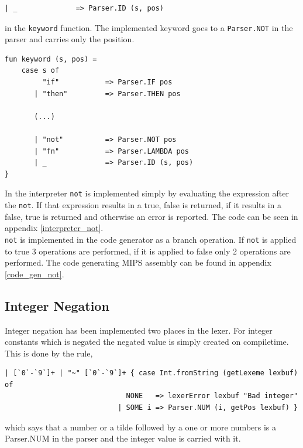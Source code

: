 \documentclass[11pt]{article}
\begin{document}
    \begin{lstlisting}
| _              => Parser.ID (s, pos)
    \end{lstlisting}

    in the \texttt{keyword} function.  The implemented keyword goes to a
    \texttt{Parser.NOT} in the parser and carries only the position.

    \begin{lstlisting}[basicstyle=\small]
fun keyword (s, pos) =
    case s of
         "if"           => Parser.IF pos
       | "then"         => Parser.THEN pos

       (...)

       | "not"          => Parser.NOT pos
       | "fn"           => Parser.LAMBDA pos
       | _              => Parser.ID (s, pos)
}
    \end{lstlisting}

    In the interpreter \texttt{not} is implemented simply by evaluating the
    expression after the \texttt{not}.  If that expression results in a true,
    false is returned, if it results in a false, true is returned and otherwise
    an error is reported.  The code can be seen in appendix
    \ref{interpreter_not}. \\

    \texttt{not} is implemented in the code generator as a branch operation.  If
    \texttt{not} is applied to true 3 operations are performed, if it is applied
    to false only 2 operations are performed.  The code generating MIPS assembly
    can be found in appendix \ref{code_gen_not}.

    \subsection{Integer Negation}
    Integer negation has been implemented two places in the lexer.  For integer
    constants which is negated the negated value is simply created on
    compiletime.  This is done by the rule,

    \begin{lstlisting}[basicstyle=\small]
| [`0`-`9`]+ | "~" [`0`-`9`]+ { case Int.fromString (getLexeme lexbuf) of
                             NONE   => lexerError lexbuf "Bad integer"
                           | SOME i => Parser.NUM (i, getPos lexbuf) }
    \end{lstlisting}

    which says that a number or a tilde followed by a one or more numbers is a
    Parser.NUM in the parser and the integer value is carried with it. \\
\end{document}
